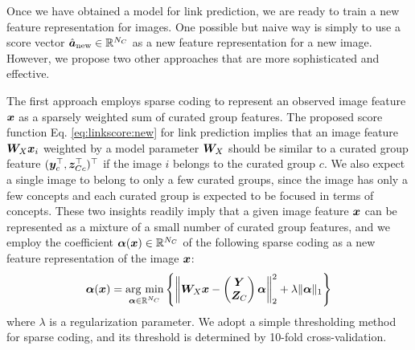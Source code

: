 \documentclass[letterpaper]{article} %
\newcommand{\argmin}{\mathop{\rm arg~min}\limits}
\begin{document}
Once we have obtained a model for link prediction, we are ready to train a new feature representation for images.
One possible but naive way is simply to use a score vector $\hat{\bm{a}}_{\rm{new}}\in\mathbb R^{N_C}$ as a new feature representation for a new image.
However, we propose two other approaches that are more sophisticated and effective.

The first approach employs sparse coding to represent an observed image feature $\bm{x}$ as a sparsely weighted sum of curated group features.
The proposed score function Eq. \eqref{eq:linkscore:new} for link prediction implies that an image feature $\bm{W}_X\bm{x}_i$ weighted by a model parameter $\bm{W}_X$ should be similar to a curated group feature $(\bm{y}_c^{\top},\bm{z}_{Cc}^{\top})^{\top}$ if the image $i$ belongs to the curated group $c$.
We also expect a single image to belong to only a few curated groups, since the image has only a few concepts and each curated group is expected to be focused in terms of concepts.
These two insights readily imply that a given image feature $\bm{x}$ can be represented as a mixture of a small number of curated group features, and we employ the coefficient $\bm{\alpha}(\bm{x})\in\mathbb R^{N_C}$ of the following sparse coding as a new feature representation of the image $\bm{x}$:
\begin{equation}
  \bm{\alpha}(\x)
  = \argmin_{\bm{\alpha}\in\bR^{N_C}} \left\{
    \left\|\W_X\x - \begin{pmatrix}\Y \\ \Z_C \end{pmatrix}
    \bm{\alpha} \right\|_2^2 + \lambda\|\bm{\alpha}\|_1 \right\}
\end{equation}
where $\lambda$ is a regularization parameter.
We adopt a simple thresholding method for sparse coding, and its threshold is determined by 10-fold cross-validation.
\end{document}
